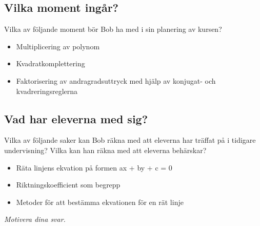 \subsection{Vilka moment ingår?}
Vilka av följande moment bör Bob ha med i sin planering av kursen?

\begin{itemize}
  \item Multiplicering av polynom
  \item Kvadratkomplettering
  \item Faktorisering av andragradsuttryck med hjälp av konjugat- och kvadreringsreglerna
\end{itemize}

\subsection{Vad har eleverna med sig?}
Vilka av följande saker kan Bob räkna med att eleverna har träffat på i tidigare undervisning? Vilka kan han räkna med att eleverna behärskar?

\begin{itemize}
  \item Räta linjens ekvation på formen ax + by + c = 0
  \item Riktningskoefficient som begrepp
  \item Metoder för att bestämma ekvationen för en rät linje
\end{itemize}

\em{Motivera dina svar.}
